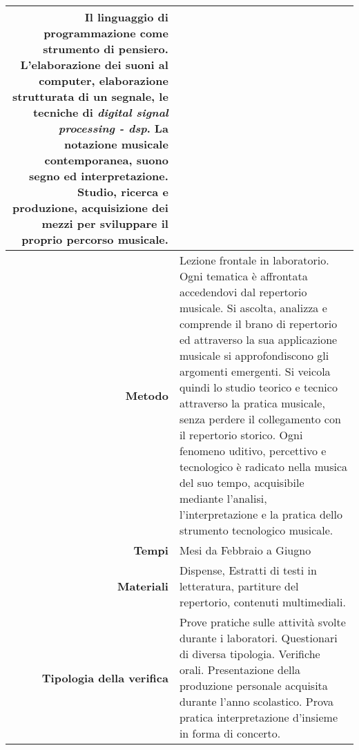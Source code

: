 \begin{longtable}{r|L{0.71\textwidth}}
      Il linguaggio di programmazione come strumento di pensiero. \newline
      L'elaborazione dei suoni al computer, elaborazione strutturata di un segnale,
      le tecniche di \emph{digital signal processing - dsp}. \newline
      La notazione musicale contemporanea, suono segno ed interpretazione. \newline
      Studio, ricerca e produzione, acquisizione dei mezzi per sviluppare il
      proprio percorso musicale. \\
    \hline
    \textbf{Metodo} &
      Lezione frontale in laboratorio. \newline
      Ogni tematica è affrontata accedendovi dal repertorio musicale.
      Si ascolta, analizza e comprende il brano di repertorio ed attraverso
      la sua applicazione musicale si approfondiscono gli argomenti emergenti.
      Si veicola quindi lo studio teorico e tecnico attraverso la pratica
      musicale, senza perdere il collegamento con il repertorio storico.
      Ogni fenomeno uditivo, percettivo e tecnologico è radicato nella
      musica del suo tempo, acquisibile mediante l'analisi, l'interpretazione
      e la pratica dello strumento tecnologico musicale. \\
    \hline
    \textbf{Tempi} &
      Mesi da Febbraio a Giugno \\
    \hline
    \textbf{Materiali} &
      Dispense, Estratti di testi in letteratura, partiture del repertorio,
      contenuti multimediali. \\
    \hline
    \textbf{Tipologia della verifica} &
      Prove pratiche sulle attività svolte durante i laboratori. \newline
      Questionari di diversa tipologia. \newline
      Verifiche orali. \newline
      Presentazione della produzione personale acquisita durante l'anno scolastico. \newline
      Prova pratica interpretazione d'insieme in forma di concerto.
  \end{longtable}%

\clearpage

